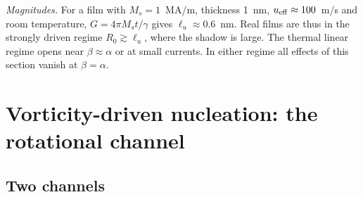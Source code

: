 \documentclass[aps,prb,twocolumn,superscriptaddress,longbibliography,floatfix]{revtex4-2}
\newcommand{\ueff}{u_{\rm eff}}
\begin{document}
\emph{Magnitudes.} For a film with $M_s=1$~MA/m, thickness 1~nm, $\ueff\approx100$~m/s and room temperature, $G=4\pi M_st/\gamma$ gives $\ell_u\approx0.6$~nm. Real films are thus in the strongly driven regime $R_0\gtrsim\ell_u$, where the shadow is large. The thermal linear regime opens near $\beta\approx\alpha$ or at small currents. In either regime all effects of this section vanish at $\beta=\alpha$.

\section{Vorticity-driven nucleation: the rotational channel}\label{sec:nucleation}

\subsection{Two channels}
\end{document}

